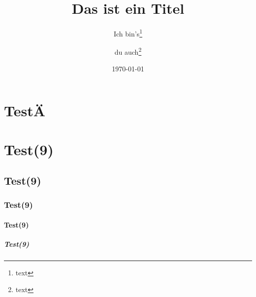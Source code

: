 \documentclass[ngerman,%
cd=full,%
a3paper,%
tudscrver=2.05,%
chapterprefix=true,
]{tudscrreprt}
\begin{document}
\providecommand*\TUDoptions[1]{}
\makeatletter



\meaning\@tud@cdoldfont@activefalse

\meaning\@tud@cdoldfont@activetrue



%
\section{TestÄ}\blindtext
\TUDoptions{cdoldfont=false}
\section{Test(9)}\blindtext
\subsection{Test(9)}\blindtext
\subsubsection{Test(9)}\blindtext
\paragraph{Test(9)}\blindtext
\subparagraph{Test(9)}\blindtext
%

\date{\today}
\title{Das ist ein Titel}
\author{Ich bin's\thanks{text}\and du auch\thanks{text}}




\end{document}
